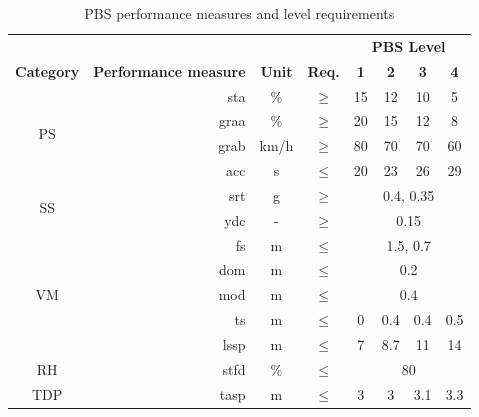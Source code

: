   \begin{table}[H]
    \centering\footnotesize
    \begin{threeparttable}
      \caption{PBS performance measures and level requirements}
      \label{table:pbs-performance-measure-requirements}
      \begin{tabular}{crcccccc}
        \toprule
        \multicolumn{4}{r}{}        & \multicolumn{4}{c}{\textbf{PBS Level}} \bigstrut\\ \cline{5-8}
        \textbf{Category} & \multicolumn{1}{c}{\textbf{Performance measure}} & \multicolumn{1}{c}{\textbf{Unit}} & \textbf{Req.} & \textbf{1} & \textbf{2} & \textbf{3} & \textbf{4} \bigstrut\\
        \hline
        \multirow{4}[8]{*}{PS} & \gls{sta} & \%    & $\geq$  & 15    & 12    & 10    & 5 \bigstrut\\
              & \gls{graa} & \%    & $\geq$  & 20    & 15    & 12    & 8 \bigstrut\\
              & \gls{grab} & km/h  & $\geq$  & 80    & 70    & 70    & 60 \bigstrut\\
              & \gls{acc} & s     & $\leq$  & 20    & 23    & 26    & 29 \bigstrut\\
        \hline
        \multirow{2}[4]{*}{SS} & \gls{srt} & g     & $\geq$  & \multicolumn{4}{c}{0.4\tnote{1}, 0.35\tnote{3}} \bigstrut\\
              & \gls{ydc} & -     & $\geq$  & \multicolumn{4}{c}{0.15} \bigstrut\\
        \hline
        \multirow{5}[10]{*}{VM} & \gls{fs} & m     & $\leq$  & \multicolumn{4}{c}{1.5\tnote{1}, 0.7\tnote{3}} \bigstrut\\
              & \gls{dom} & m     & $\leq$  & \multicolumn{4}{c}{0.2} \bigstrut\\
              & \gls{mod} & m     & $\leq$  & \multicolumn{4}{c}{0.4} \bigstrut\\
              & \gls{ts} & m     & $\leq$  & 0     & 0.4   & 0.4   & 0.5 \bigstrut\\
              & \gls{lssp} & m     & $\leq$  & 7     & 8.7   & 11    & 14 \bigstrut\\
        \hline
        RH    & \gls{stfd} & \%    & $\leq$  & \multicolumn{4}{c}{80} \bigstrut\\
        \hline
        \multirow{3}[6]{*}{TDP} & \gls{tasp} & m     & $\leq$  & 3     & 3     & 3.1   & 3.3 \bigstrut\\

\end{tabular}
\end{threeparttable}
\end{table}
